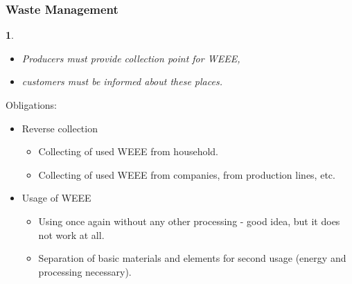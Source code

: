\documentclass{beamer}
\newtheorem{myDef}{}
\begin{document}
	\begin{frame}
    \frametitle{Waste Management}
		\begin{myDef}
		\begin{itemize}
			\item Producers must provide collection point for WEEE,
			\item customers must be informed about these places.
		\end{itemize}
		\end{myDef}
		Obligations:
		
		\begin{itemize}
			\item Reverse collection
			\begin{itemize}
				\item Collecting of used WEEE from household.
				\item Collecting of used WEEE from companies, from production lines, etc.
			\end{itemize}
			\item Usage of WEEE
			\begin{itemize}
				\item Using once again without any other processing - good idea, but it does not work at all.
				\item Separation of basic materials and elements for second usage (energy and processing necessary).
			\end{itemize}
		\end{itemize}
	\end{frame}
\end{document}
